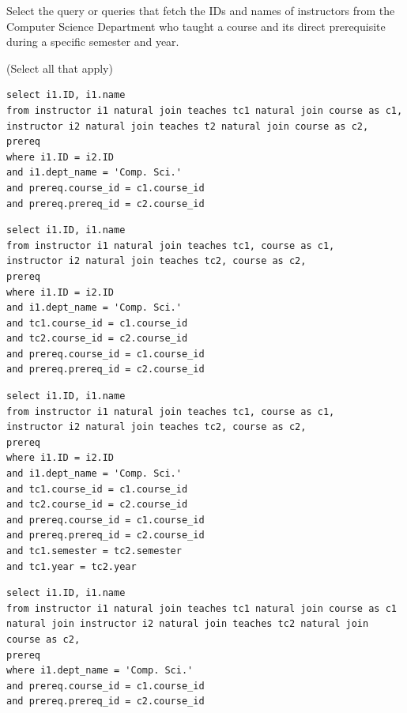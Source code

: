 \documentclass[12pt, addpoints, answers]{exam}
\begin{document}
\begin{questions}
\begin{minipage}{\linewidth}
\question[8]
Select the query or queries that fetch the IDs and names of instructors from the Computer Science Department 
who taught a course and its direct prerequisite during a specific semester and year.\par\vspace{0.5em}
(Select all that apply)\par\vspace{0.5em}
\begin{checkboxes} 
    \choice \begin{verbatim}
select i1.ID, i1.name
from instructor i1 natural join teaches tc1 natural join course as c1, 
instructor i2 natural join teaches t2 natural join course as c2,
prereq
where i1.ID = i2.ID
and i1.dept_name = 'Comp. Sci.'
and prereq.course_id = c1.course_id
and prereq.prereq_id = c2.course_id
    \end{verbatim}
    \choice \begin{verbatim}
select i1.ID, i1.name
from instructor i1 natural join teaches tc1, course as c1, 
instructor i2 natural join teaches tc2, course as c2,
prereq
where i1.ID = i2.ID
and i1.dept_name = 'Comp. Sci.'
and tc1.course_id = c1.course_id
and tc2.course_id = c2.course_id
and prereq.course_id = c1.course_id
and prereq.prereq_id = c2.course_id
    \end{verbatim}
    \CorrectChoice \begin{verbatim}
select i1.ID, i1.name
from instructor i1 natural join teaches tc1, course as c1, 
instructor i2 natural join teaches tc2, course as c2,
prereq
where i1.ID = i2.ID
and i1.dept_name = 'Comp. Sci.'
and tc1.course_id = c1.course_id
and tc2.course_id = c2.course_id
and prereq.course_id = c1.course_id
and prereq.prereq_id = c2.course_id
and tc1.semester = tc2.semester
and tc1.year = tc2.year
    \end{verbatim}
    \choice \begin{verbatim}
select i1.ID, i1.name
from instructor i1 natural join teaches tc1 natural join course as c1 
natural join instructor i2 natural join teaches tc2 natural join course as c2,
prereq
where i1.dept_name = 'Comp. Sci.'
and prereq.course_id = c1.course_id
and prereq.prereq_id = c2.course_id
    \end{verbatim}
\end{checkboxes}
\end{minipage}\vspace{1em}


\end{questions}
\end{document}
